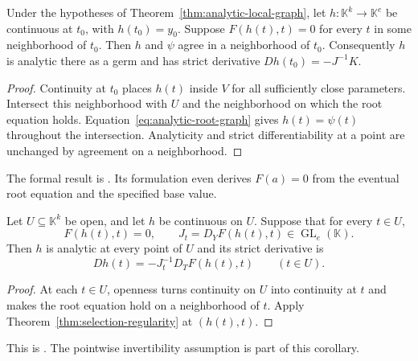 \begin{theorem}
\label{thm:selection-regularity}
Under the hypotheses of Theorem~\ref{thm:analytic-local-graph}, let
$h:\mathbb K^k\to\mathbb K^e$ be continuous at $t_0$, with
$h(t_0)=y_0$. Suppose $F(h(t),t)=0$ for every $t$ in some neighborhood of
$t_0$. Then $h$ and $\psi$ agree in a neighborhood of $t_0$. Consequently
$h$ is analytic there as a germ and has strict derivative
$Dh(t_0)=-J^{-1}K$.
\end{theorem}
\begin{proof}
Continuity at $t_0$ places $h(t)$ inside $V$ for all sufficiently close
parameters. Intersect this neighborhood with $U$ and the neighborhood on
which the root equation holds. Equation~\eqref{eq:analytic-root-graph} gives
$h(t)=\psi(t)$ throughout the intersection. Analyticity and strict
differentiability at a point are unchanged by agreement on a neighborhood.
\end{proof}
The formal result is
.
Its formulation even derives $F(a)=0$ from the eventual root equation and
the specified base value.

\begin{corollary}
\label{cor:selection-open-regularity}
Let $U\subseteq\mathbb K^k$ be open, and let $h$ be continuous on $U$.
Suppose that for every $t\in U$,
\[
 F(h(t),t)=0,
 \qquad J_t=D_YF(h(t),t)\in\operatorname{GL}_e(\mathbb K).
\]
Then $h$ is analytic at every point of $U$ and its strict derivative is
\[
 Dh(t)=-J_t^{-1}D_TF(h(t),t)\qquad(t\in U).
\]
\end{corollary}
\begin{proof}
At each $t\in U$, openness turns continuity on $U$ into continuity at $t$
and makes the root equation hold on a neighborhood of $t$. Apply
Theorem~\ref{thm:selection-regularity} at $(h(t),t)$.
\end{proof}
This is
.
The pointwise invertibility assumption is part of this corollary.

